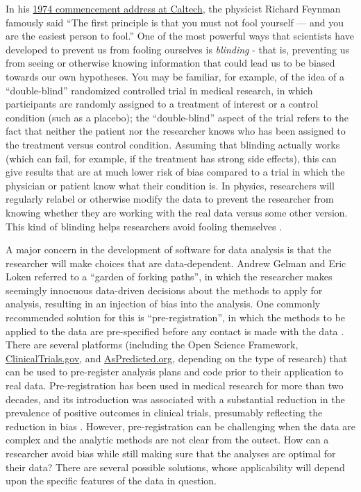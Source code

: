 In his \href{https://calteches.library.caltech.edu/51/2/CargoCult.htm}{1974 commencement address at Caltech}, the physicist Richard Feynman famously said ``The first principle is that you must not fool yourself --- and you are the easiest person to fool.'' One of the most powerful ways that scientists have developed to prevent us from fooling ourselves is \textit{blinding} - that is, preventing us from seeing or otherwise knowing information that could lead us to be biased towards our own hypotheses.
You may be familiar, for example, of the idea of a ``double-blind'' randomized controlled trial in medical research, in which participants are randomly assigned to a treatment of interest or a control condition (such as a placebo); the ``double-blind'' aspect of the trial refers to the fact that neither the patient nor the researcher knows who has been assigned to the treatment versus control condition.
Assuming that blinding actually works (which can fail, for example, if the treatment has strong side effects), this can give results that are at much lower risk of bias compared to a trial in which the physician or patient know what their condition is.
In physics, researchers will regularly relabel or otherwise modify the data to prevent the researcher from knowing whether they are working with the real data versus some other version.
This kind of blinding helps researchers avoid fooling themselves \citep{MacCoun:2015aa}.

A major concern in the development of software for data analysis is that the researcher will make choices that are data-dependent.
Andrew Gelman and Eric Loken \citep{Gelman:2014aa} referred to a ``garden of forking paths'', in which the researcher makes seemingly innocuous data-driven decisions about the methods to apply for analysis, resulting in an injection of bias into the analysis.
One commonly recommended solution for this is ``pre-registration'', in which the methods to be applied to the data are pre-specified before any contact is made with the data \citep{Nosek:2018aa}.
There are several platforms (including the Open Science Framework, \href{http://ClinicalTrials.gov}{ClinicalTrials.gov}, and \href{http://AsPredicted.org}{AsPredicted.org}, depending on the type of research) that can be used to pre-register analysis plans and code prior to their application to real data.
Pre-registration has been used in medical research for more than two decades, and its introduction was associated with a substantial reduction in the prevalence of positive outcomes in clinical trials, presumably reflecting the reduction in bias \citep{Kaplan:2015aa}.
However, pre-registration can be challenging when the data are complex and the analytic methods are not clear from the outset.
How can a researcher avoid bias while still making sure that the analyses are optimal for their data? There are several possible solutions, whose applicability will depend upon the specific features of the data in question.

